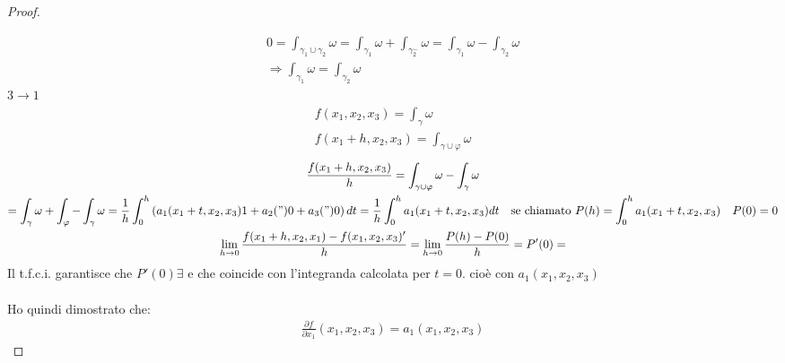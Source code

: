 \documentclass[a4paper, oneside]{article}
\newcommand\bulletout  {\labelitemfont \textbullet}
\begin{document}
\begin{proof}
\begin{center}
    \end{center}
    \begin{gather*}
        0 = \int_{\gamma_1 \cup \gamma_2} \omega = \int_{\gamma_1} \omega + \int_{\gamma_2^-} \omega = \int_{\gamma_1} \omega -\int_{\gamma_2} \omega\\
        \Rightarrow \int_{\gamma_1} \omega = \int_{\gamma_2} \omega 
    \end{gather*}
    \bulletout $3 \rightarrow 1$\\
    \begin{gather*}
        f(x_1,x_2,x_3) = \int_{\gamma} \omega \\
        f(x_1+h,x_2,x_3) = \int_{\gamma \cup \varphi} \omega
    \end{gather*}
    \begin{gather*}
        \frac{f(x_1+h,x_2,x_3)}{h} = \int_{\gamma \cup \varphi} \omega - \int_{\gamma} \omega\\
        = \int_{\gamma} \omega + \int_{\varphi} - \int_{\gamma} \omega = \frac{1}{h} \int_{0}^{h} \left( a_1(x_1+t,x_2,x_3) 1 + a_2(") 0 + a_3(") 0 \right)dt
        = \frac{1}{h} \int_{0}^{h} a_1(x_1+t,x_2,x_3) dt \quad \text{se chiamato } P(h) = \int_{0}^{h} a_1(x_1+t,x_2,x_3) \quad P(0) = 0\\
        \lim_{h \to 0} \frac{f(x_1+h,x_2,x_1) - f(x_1,x_2,x_3)'}{h} = \lim_{h \to 0} \frac{P(h) - P(0)}{h} = P'(0) =
    \end{gather*}
    Il t.f.c.i. garantisce che $P'(0) \exists$ e che coincide con l'integranda calcolata per $t=0$. cioè con $a_1(x_1,x_2,x_3)$\\\\
    Ho quindi dimostrato che:
    \begin{gather*}
        \frac{\partial f}{\partial x_1} (x_1,x_2,x_3) = a_1(x_1,x_2,x_3)
    \end{gather*}
\end{proof}
\end{document}
